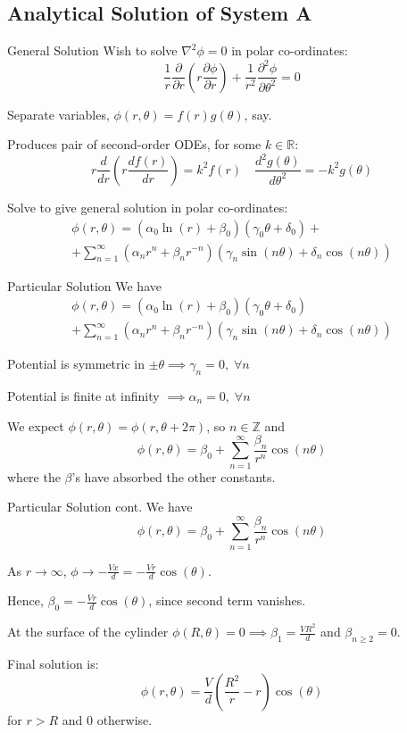\documentclass{beamer}
\newcommand{\be}{\begin{equation}}
\newcommand{\ee}{\end{equation}}
\begin{document}
\subsection{Analytical Solution of System A}

\begin{frame}{General Solution}
Wish to solve $\nabla ^2 \phi = 0$ in polar co-ordinates:
%
\be
\frac{1}{r}\frac{\partial}{\partial r}(r \frac{\partial \phi}{\partial r})
+ \frac{1}{r^2}\frac{\partial ^2 \phi}{\partial \theta^2} = 0
\ee

Separate variables, $\phi(r,\theta)=f(r)g(\theta)$, say.

Produces pair of second-order ODEs, for some $k \in \mathbb{R}$:
%
\be
r\frac{d}{dr}(r \frac{df(r)}{dr}) = k^2 f(r) \quad \frac{d^2 g(\theta)}{d\theta^2} = -k^2 g(\theta)
\ee

Solve to give general solution in polar co-ordinates:
%
\begin{multline}
\phi(r, \theta) = (\alpha_0 \ln(r) + \beta_0)(\gamma_0\theta + \delta_0) + 
\\
                + \sum_{n=1}^{\infty}(\alpha_n r^n+\beta_n r^{-n})(\gamma_n \sin(n\theta) + \delta_n \cos(n\theta))
\end{multline}
\end{frame}

\begin{frame}{Particular Solution}
We have
%
\begin{multline}
\phi(r, \theta) = (\alpha_0 \ln(r) + \beta_0)(\gamma_0\theta + \delta_0) \\
                + \sum_{n=1}^{\infty}(\alpha_n r^n+\beta_n r^{-n})(\gamma_n \sin(n\theta) + \delta_n \cos(n\theta))
\end{multline}

Potential is symmetric in $\pm\theta \implies \gamma_n=0, \; \forall n$

Potential is finite at infinity $\implies \alpha_n=0, \; \forall n$

We expect $\phi(r, \theta)=\phi(r, \theta +2\pi)$, so $n \in \mathbb{Z}$ and
%
\be
\phi(r, \theta) = \beta_0 + \sum_{n=1}^{\infty} \frac{\beta_n}{r^n} \cos(n\theta)
\ee
%
where the $\beta$'s have absorbed the other constants.
\end{frame}

\begin{frame}{Particular Solution cont.}
We have
%
\be
\phi(r, \theta) = \beta_0 + \sum_{n=1}^{\infty} \frac{\beta_n}{r^n} \cos(n\theta)
\ee

As $r \rightarrow \infty$, $\phi \rightarrow -\frac{Vx}{d}=-\frac{Vr}{d}\cos(\theta)$.

Hence, $\beta_0=-\frac{Vr}{d}\cos(\theta)$, since second term vanishes.

At the surface of the cylinder $\phi(R,\theta) = 0 \implies \beta_1=\frac{VR^2}{d}$ and
$\beta_{n \geq 2} = 0$.

Final solution is:
%
\be
\phi(r, \theta) = \frac{V}{d}(\frac{R^2}{r}-r)\cos(\theta)
\ee
for $r>R$ and $0$ otherwise.

\end{frame}
\end{document}

